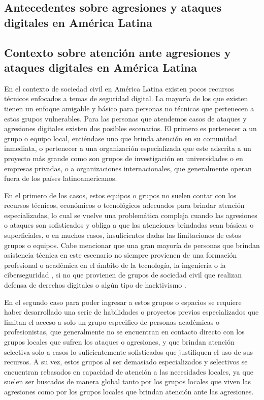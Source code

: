 \documentclass[12pt]{caltech_thesis}
\begin{document}
\subsection{Antecedentes sobre agresiones y ataques digitales en América Latina}

\subsection{Contexto sobre atención ante agresiones y ataques digitales en América Latina}

En el contexto de sociedad civil en América Latina  existen pocos recursos técnicos enfocados a temas de seguridad digital. La mayoría de los que existen tienen un enfoque amigable y básico para personas no técnicas que pertenecen a estos grupos vulnerables. Para las personas que atendemos casos de ataques y agresiones digitales existen dos posibles escenarios. El primero es pertenecer a un grupo o equipo local, entiéndase uno que brinda atención en su comunidad inmediata, o pertenecer a una organización especializada que este adscrita a un proyecto más grande como son grupos de investigación en universidades o en empresas privadas, o a organizaciones internacionales, que generalmente operan fuera de los países latinoamericanos.

En el primero de los casos, estos equipos o grupos no suelen contar con los recursos técnicos, económicos o tecnológicos adecuados para brindar atención especializadas, lo cual se vuelve una problemática compleja cuando las agresiones o ataques son sofisticados y obliga a que las atenciones brindadas sean básicas o superficiales, o en muchos casos, insuficientes dadas las limitaciones de estos grupos o equipos. Cabe mencionar que una gran mayoría de personas que brindan asistencia técnica en este escenario no siempre provienen de una formación profesional o académica en el ámbito de la tecnología, la ingeniería o la ciberseguridad , si no que provienen de grupos de sociedad civil que realizan defensa de derechos digitales  o algún tipo de hacktivismo .

En el segundo caso para poder ingresar a estos grupos o espacios se requiere haber desarrollado una serie de habilidades o proyectos previos especializados que limitan el acceso a solo un grupo especifico de personas académicas o profesionistas, que generalmente no se encuentran en contacto directo con los grupos locales que sufren los ataques o agresiones, y que brindan atención selectiva solo a casos lo suficientemente sofisticados que justifiquen el uso de sus recursos. A su vez, estos grupos al ser demasiado especializados y selectivos se encuentran rebasados en capacidad de atención a las necesidades locales, ya que suelen ser buscados de manera global tanto por los grupos locales que viven las agresiones como por los grupos locales que brindan atención ante las agresiones.
\end{document}
